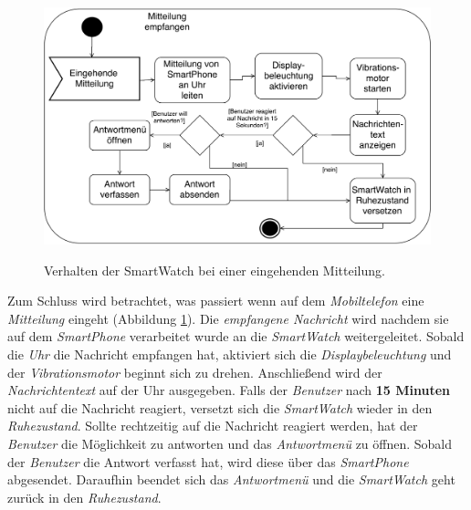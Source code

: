 \begin{figure}[h]
\centering\
\includegraphics[width=\textwidth]{img/activityMitteilung}
\caption{Verhalten der SmartWatch bei einer eingehenden Mitteilung.}\label{fig:activityMitteilung}
\end{figure}
Zum Schluss wird betrachtet, was passiert wenn auf dem \textit{Mobiltelefon} eine \textit{Mitteilung} eingeht (Abbildung \ref{fig:activityMitteilung}). Die \textit{empfangene Nachricht} wird nachdem sie auf dem \textit{SmartPhone} verarbeitet wurde an die \textit{SmartWatch} weitergeleitet. Sobald die \textit{Uhr} die Nachricht empfangen hat, aktiviert sich die \textit{Displaybeleuchtung} und der \textit{Vibrationsmotor} beginnt sich zu drehen. Anschließend wird der \textit{Nachrichtentext} auf der Uhr ausgegeben. Falls der \textit{Benutzer} nach \textbf{15 Minuten} nicht auf die Nachricht reagiert, versetzt sich die \textit{SmartWatch} wieder in den \textit{Ruhezustand}. Sollte rechtzeitig auf die Nachricht reagiert werden, hat der \textit{Benutzer} die Möglichkeit zu antworten und das \textit{Antwortmenü} zu öffnen. Sobald der \textit{Benutzer} die Antwort verfasst hat, wird diese über das \textit{SmartPhone} abgesendet. Daraufhin beendet sich das \textit{Antwortmenü} und die \textit{SmartWatch} geht zurück in den \textit{Ruhezustand}.